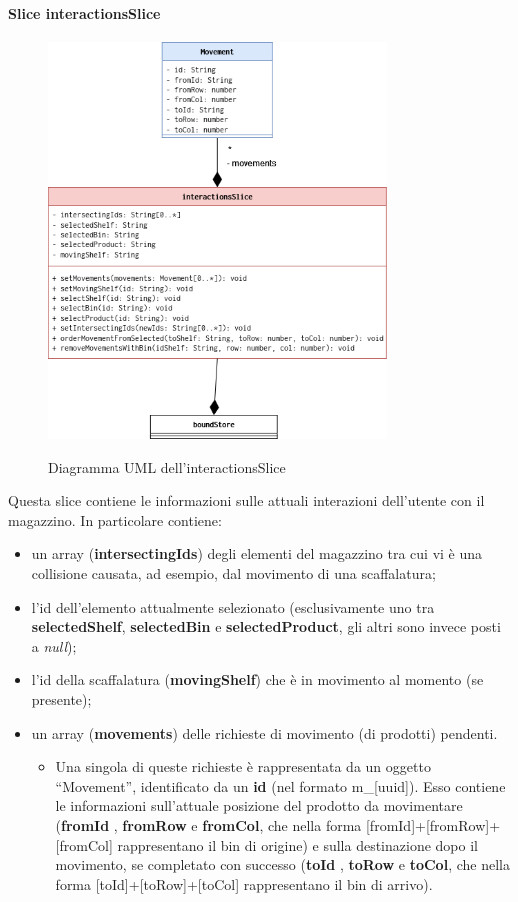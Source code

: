 \paragraph{Slice interactionsSlice}
\begin{figure}[H]
    \centering
    \includegraphics[width=0.8\textwidth]{images/UML/feature_model_interactionsSlice.drawio.png}
    \label{fig:UML_interactionsSlice}
    \caption{Diagramma UML dell'interactionsSlice}
\end{figure}
Questa slice contiene le informazioni sulle attuali interazioni dell'utente con il magazzino. In particolare contiene:
\begin{itemize}
    \item un array (\textbf{intersectingIds}) degli elementi del magazzino tra cui vi è una collisione causata, ad esempio, dal movimento di una scaffalatura;
    \item l'id dell'elemento attualmente selezionato (esclusivamente uno tra \textbf{selectedShelf}, \textbf{selectedBin} e \textbf{selectedProduct}, gli altri sono invece posti a \textit{null});
    \item l'id della scaffalatura (\textbf{movingShelf}) che è in movimento al momento (se presente);
    \item un array (\textbf{movements}) delle richieste di movimento (di prodotti) pendenti. 
        \begin{itemize}
            \item Una singola di queste richieste è rappresentata da un oggetto ``Movement'', identificato da un \textbf{id} (nel formato m\_[uuid]). Esso contiene le informazioni sull'attuale posizione del prodotto da movimentare (\textbf{fromId} , \textbf{fromRow} e \textbf{fromCol}, che nella forma [fromId]+[fromRow]+[fromCol] rappresentano il bin di origine) e sulla destinazione dopo il movimento, se completato con successo (\textbf{toId} , \textbf{toRow} e \textbf{toCol}, che nella forma [toId]+[toRow]+[toCol] rappresentano il bin di arrivo).
        \end{itemize}
\end{itemize}

